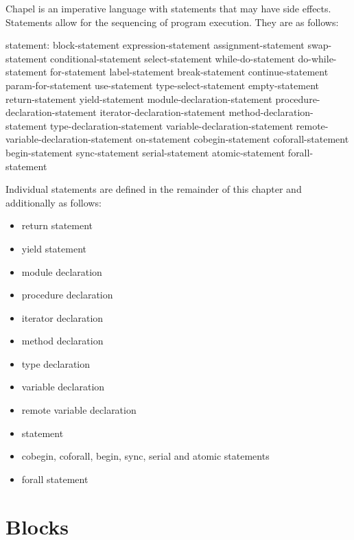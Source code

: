 \label{Statements}


Chapel is an imperative language with statements that may have side
effects.  Statements allow for the sequencing of program execution.
They are as follows:
\begin{syntax}
statement:
  block-statement
  expression-statement
  assignment-statement
  swap-statement
  conditional-statement
  select-statement
  while-do-statement
  do-while-statement
  for-statement
  label-statement
  break-statement
  continue-statement
  param-for-statement
  use-statement
  type-select-statement
  empty-statement
  return-statement
  yield-statement
  module-declaration-statement
  procedure-declaration-statement
  iterator-declaration-statement
  method-declaration-statement
  type-declaration-statement
  variable-declaration-statement
  remote-variable-declaration-statement
  on-statement
  cobegin-statement
  coforall-statement
  begin-statement
  sync-statement
  serial-statement
  atomic-statement
  forall-statement
\end{syntax}

Individual statements are defined in the remainder of this chapter
and additionally as follows:
\begin{itemize}
\item return statement 
\item yield statement 
\item module declaration 
\item procedure declaration 
\item iterator declaration 
\item method declaration 
\item type declaration 
\item variable declaration 
\item remote variable declaration ~
\item {} statement 
\item cobegin, coforall, begin, sync, serial and atomic statements
\item forall statement 
\end{itemize}

\section{Blocks}
\label{Blocks}

